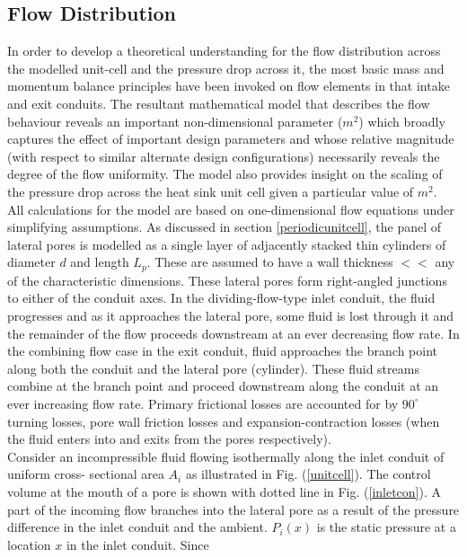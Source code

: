 \documentclass[twocolumn,10pt,cleanfoot]{ihmtc}
\begin{document}
\subsection{Flow Distribution}\label{BMmodel}
In order to develop a theoretical understanding for the flow distribution
across the modelled unit-cell and the pressure drop across it, the most
basic mass and momentum balance principles have been invoked on flow
elements in that intake and exit conduits. The resultant mathematical
model that describes the flow behaviour reveals an important non-dimensional
parameter ($m^2$) which broadly captures the effect of important
design parameters and whose relative magnitude (with respect to similar
alternate design configurations) necessarily reveals the degree of
the flow uniformity. The model also provides insight on the scaling
of the pressure drop across the heat sink unit cell given a particular
value of $m^2$. \\
%
%
All calculations for the model are based on one-dimensional flow equations
under simplifying assumptions. As discussed in section \ref{periodicunitcell}, the panel of lateral pores is modelled
as a single layer of adjacently stacked thin cylinders of diameter
$d$ and length $L_p$. These are assumed to have a wall thickness
$<<$ any of the characteristic dimensions. These lateral
pores form right-angled junctions to either of the conduit
axes. In the dividing-flow-type inlet conduit, the fluid progresses
and as it approaches the lateral pore, some fluid is lost through
it and the remainder of the flow proceeds downstream at an ever decreasing
flow rate. In the combining flow case in the exit conduit, fluid approaches
the branch point along both the conduit and the lateral pore (cylinder).
These fluid streams combine at the branch point and proceed downstream along the conduit at an ever increasing flow rate. Primary
frictional losses are accounted for by $90^{\circ}$ turning losses,
pore wall friction losses and expansion-contraction losses (when the fluid enters into and exits from the pores respectively). \\
%
%
Consider an incompressible fluid flowing isothermally along the inlet
conduit of uniform cross- sectional area $A_i$ as illustrated in
Fig. (\ref{unitcell}). The control volume at the mouth of a pore is shown with dotted line in Fig. (\ref{inletcon}). A part of
the incoming flow branches into the lateral pore as a result of the
pressure difference in the inlet conduit and the ambient. $P_i(x)$
is the static pressure at a location $x$ in the inlet conduit. Since
\end{document}
